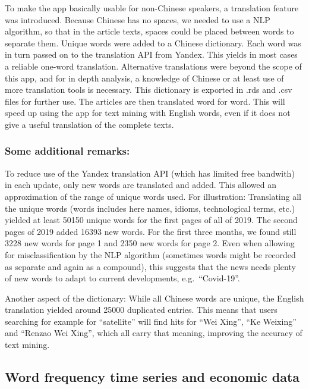 \documentclass[12pt,a4paper]{article}
\begin{document}
To make the app basically usable for non-Chinese speakers, a translation feature was introduced. Because Chinese has no spaces, we needed to use a NLP algorithm, so that in the article texts, spaces could be placed between words to separate them. Unique words were added to a Chinese dictionary. Each word was in turn passed on to the translation API from Yandex. This yields in most cases a reliable one-word translation. Alternative translations were beyond the scope of this app, and for in depth analysis, a knowledge of Chinese or at least use of more translation tools is necessary. This dictionary is exported in .rds and .csv files for further use. The articles are then translated word for word. This will speed up using the app for text mining with English words, even if it does not give a useful translation of the complete texts.

\hypertarget{some-additional-remarks}{%
\subsubsection{Some additional remarks:}\label{some-additional-remarks}}

To reduce use of the Yandex translation API (which has limited free bandwith) in each update, only new words are translated and added. This allowed an approximation of the range of unique words used. For illustration: Translating all the unique words (words includes here names, idioms, technological terms, etc.) yielded at least 50150 unique words for the first pages of all of 2019. The second pages of 2019 added 16393 new words. For the first three months, we found still 3228 new words for page 1 and 2350 new words for page 2. Even when allowing for misclassification by the NLP algorithm (sometimes words might be recorded as separate and again as a compound), this suggests that the news needs plenty of new words to adapt to current developments, e.g.~\enquote{Covid-19}.

Another aspect of the dictionary: While all Chinese words are unique, the English translation yielded around 25000 duplicated entries. This means that users searching for example for \enquote{satellite} will find hits for \enquote{Wei Xing}, \enquote{Ke Weixing} and \enquote{Renzao Wei Xing}, which all carry that meaning, improving the accuracy of text mining.

\hypertarget{word-frequency-time-series-and-economic-data}{%
\subsection{Word frequency time series and economic data}\label{word-frequency-time-series-and-economic-data}}
\end{document}
